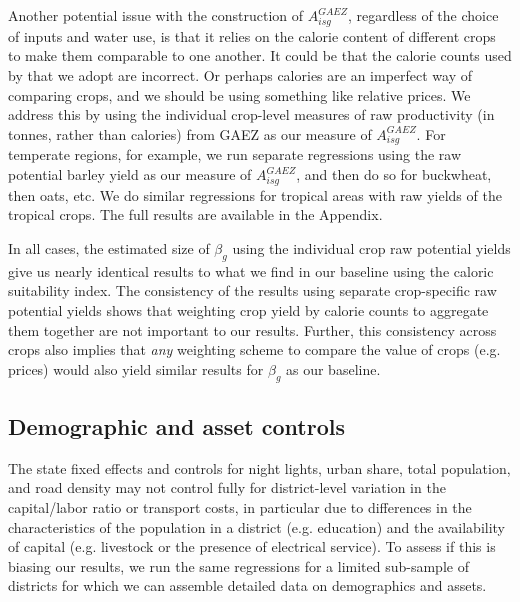 \documentclass[12pt]{article}
\begin{document}
Another potential issue with the construction of $A^{GAEZ}_{isg}$, regardless of the choice of inputs and water use, is that it relies on the calorie content of different crops to make them comparable to one another. It could be that the calorie counts used by \cite{galorozak2016} that we adopt are incorrect. Or perhaps calories are an imperfect way of comparing crops, and we should be using something like relative prices. We address this by using the individual crop-level measures of raw productivity (in tonnes, rather than calories) from GAEZ as our measure of $A^{GAEZ}_{isg}$. For temperate regions, for example, we run separate regressions using the raw potential barley yield as our measure of $A^{GAEZ}_{isg}$, and then do so for buckwheat, then oats, etc. We do similar regressions for tropical areas with raw yields of the tropical crops. The full results are available in the Appendix. 

In all cases, the estimated size of $\beta_g$ using the individual crop raw potential yields give us nearly identical results to what we find in our baseline using the caloric suitability index. The consistency of the results using separate crop-specific raw potential yields shows that weighting crop yield by calorie counts to aggregate them together are not important to our results. Further, this consistency across crops also implies that \textit{any} weighting scheme to compare the value of crops (e.g. prices) would also yield similar results for $\beta_g$ as our baseline. 

\subsection{Demographic and asset controls} 
The state fixed effects and controls for night lights, urban share, total population, and road density may not control fully for district-level variation in the capital/labor ratio or transport costs, in particular due to differences in the characteristics of the population in a district (e.g. education) and the availability of capital (e.g. livestock or the presence of electrical service). To assess if this is biasing our results, we run the same regressions for a limited sub-sample of districts for which we can assemble detailed data on demographics and assets.
\end{document}
